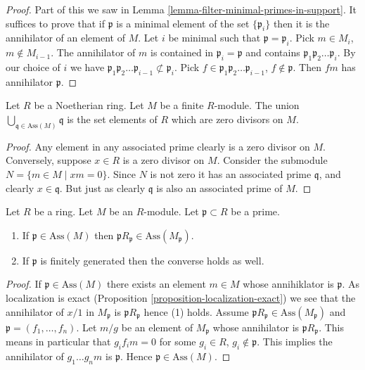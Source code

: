 \begin{proof}
Part of this we saw in Lemma \ref{lemma-filter-minimal-primes-in-support}.
It suffices to prove that if $\mathfrak p$ is a minimal element of
the set $\{\mathfrak p_i\}$ then it is the annihilator of
an element of $M$. Let $i$ be minimal such that
$\mathfrak p = \mathfrak p_i$.
Pick $m \in M_i$, $m \not \in M_{i-1}$. The annihilator of $m$
is contained in $\mathfrak p_i = \mathfrak p$ and contains
$\mathfrak p_1 \mathfrak p_2 \ldots \mathfrak p_i$. By our choice of
$i$ we have $\mathfrak p_1 \mathfrak p_2 \ldots \mathfrak p_{i-1}
\not \subset \mathfrak p_i$. Pick
$f \in \mathfrak p_1 \mathfrak p_2 \ldots \mathfrak p_{i-1}$,
$f \not \in \mathfrak p$. Then $fm$ has annihilator $\mathfrak p$.
\end{proof}

\begin{lemma}
\label{lemma-ass-zero-divisors}
Let $R$ be a Noetherian ring.
Let $M$ be a finite $R$-module.
The union $\bigcup_{\mathfrak q \in \text{Ass}(M)} \mathfrak q$
is the set elements of $R$ which are zero divisors on $M$.
\end{lemma}

\begin{proof}
Any element in any associated prime clearly is a zero divisor
on $M$. Conversely, suppose $x \in R$ is a zero divisor on $M$.
Consider the submodule $N = \{m \in M \mid xm = 0\}$.
Since $N$ is not zero it has an associated prime $\mathfrak q$,
and clearly $x \in \mathfrak q$. But just as clearly $\mathfrak q$
is also an associated prime of $M$.
\end{proof}

\begin{lemma}
\label{lemma-associated-primes-localize}
Let $R$ be a ring.
Let $M$ be an $R$-module.
Let $\mathfrak p \subset R$ be a prime.
\begin{enumerate}
\item If $\mathfrak p \in \text{Ass}(M)$ then
$\mathfrak pR_{\mathfrak p} \in \text{Ass}(M_{\mathfrak p})$.
\item If $\mathfrak p$ is finitely generated then the converse holds
as well.
\end{enumerate}
\end{lemma}

\begin{proof}
If $\mathfrak p \in \text{Ass}(M)$ there exists an element $m \in M$
whose annihiklator is $\mathfrak p$. As localization is exact
(Proposition \ref{proposition-localization-exact})
we see that the annihilator of $x/1$ in
$M_{\mathfrak p}$ is $\mathfrak pR_{\mathfrak p}$ hence (1) holds.
Assume $\mathfrak pR_{\mathfrak p} \in \text{Ass}(M_{\mathfrak p})$
and $\mathfrak p = (f_1, \ldots, f_n)$. Let $m/g$ be an element of
$M_{\mathfrak p}$ whose annihilator is $\mathfrak pR_{\mathfrak p}$.
This means in particular that $g_if_im = 0$ for some $g_i \in R$,
$g_i \not \in \mathfrak p$. This implies
the annihilator of $g_1\ldots g_nm$ is $\mathfrak p$. Hence
$\mathfrak p \in \text{Ass}(M)$.
\end{proof}

